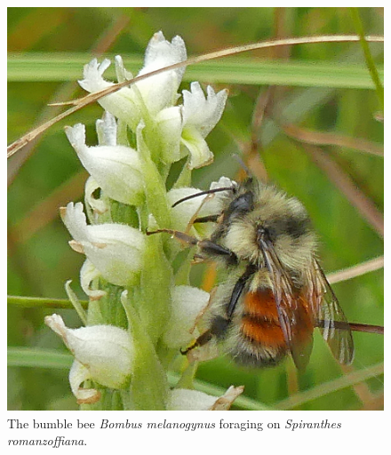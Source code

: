 \begin{multicols}{2}
\begin{figure}[H]
\begin{center}
\vspace{2mm}
\includegraphics[width=\textwidth]{img/Bombus_melanogynus.jpg}
\caption{The bumble bee \emph{Bombus melanogynus} foraging on \emph{Spiranthes romanzoffiana}.}
\label{Bombus_melanogynus}
\end{center}
\end{figure}



\end{multicols}
